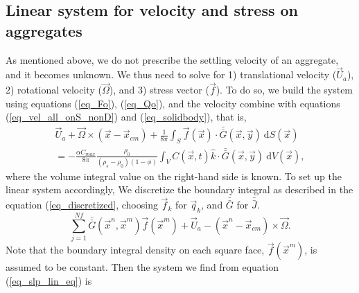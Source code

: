  \subsection{Linear system for velocity and stress on aggregates}
 As mentioned above, we do not prescribe the settling velocity of an aggregate, and it becomes unknown.
We thus need to solve for 1) translational velocity ($\vec{U}_a$), 2) rotational velocity ($\vec{\Omega}$), and 3) stress vector ($\vec{f}$).
To do so, 
we build the system using equations (\ref{eq_Fo}), (\ref{eq_Qo}), and the velocity combine with equations (\ref{eq_vel_all_onS_nonD}) and (\ref{eq_solidbody}), that is,
 \begin{align}
	\vec{U}_a + \vec{\Omega} \times (\vec{x} - \vec{x}_{cm})
+ \frac{1}{8 \pi} \int_{S}  
		  \vec{f}(\vec{x}) 
		  \cdot \bar{\bar{G  }} (\vec{x},\vec{y}) 
		  \ \textrm{d}S(\vec{x})
		  \nonumber \\
=  -\frac{ \alpha C_{max}}{8\pi } \frac{\rho_0}{(\rho_s - \rho_0)(1-\phi)} 
\int_{V} C\left(\vec{x},  t \right) \hat{k} \cdot 
\bar{\bar{G}}(\vec{x}, \vec{y} ) 
\ \text{d}V(\vec{x}),
 \label{eq_slp_lin_eq}
 \end{align}
where the volume integral value on the right-hand side is known. 
To set up the linear system accordingly, We discretize the boundary integral as described in the equation (\ref{eq_discretized}, choosing $\vec{f}_k$ for $\vec{q}_k$, and $ \bar{\bar{G}}$ for $\bar{\bar{J}}$. 
\begin{equation}
\sum_{j = 1}^{Nf}
	 \bar{\bar{G}}(\vec{x}^n,  \vec{x}^m)  \vec{f}(\vec{x}^m)
	+ \vec{U}_a - 
	(\vec{x}^n - \vec{x}_{cm}) \times \vec{\Omega}.
\end{equation}
Note that the boundary integral density on each square face, $\vec{f}(\vec{x}^m)$, is assumed to be constant. 
 Then the system we find from equation (\ref{eq_slp_lin_eq}) is  
